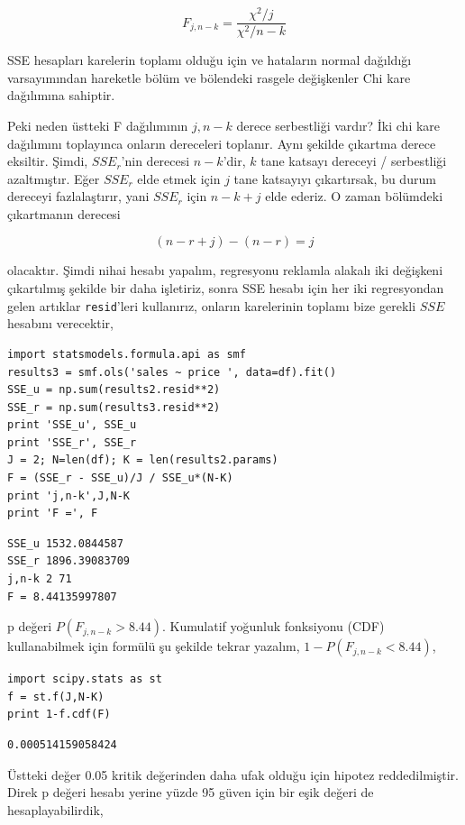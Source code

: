 \documentclass[12pt,fleqn]{article}\usepackage{../../common}
\begin{document}
$$ F_{j,n-k} = \frac{\chi^2 / j}{\chi^2 / n-k} $$

SSE hesapları karelerin toplamı olduğu için ve hataların normal dağıldığı
varsayımından hareketle bölüm ve bölendeki rasgele değişkenler Chi kare
dağılımına sahiptir.

Peki neden üstteki F dağılımının $j,n-k$ derece serbestliği vardır? İki chi
kare dağılımını toplayınca onların dereceleri toplanır. Aynı şekilde
çıkartma derece eksiltir. Şimdi, $SSE_r$'nin derecesi $n-k$'dir, $k$ tane
katsayı dereceyi / serbestliği azaltmıştır. Eğer $SSE_r$ elde etmek için
$j$ tane katsayıyı çıkartırsak, bu durum dereceyi fazlalaştırır, yani
$SSE_r$ için $n-k+j$ elde ederiz. O zaman bölümdeki çıkartmanın derecesi

$$ (n-r+j) - (n-r) = j$$

olacaktır. Şimdi nihai hesabı yapalım, regresyonu reklamla alakalı iki
değişkeni çıkartılmış şekilde bir daha işletiriz, sonra SSE hesabı için her
iki regresyondan gelen artıklar \verb!resid!'leri kullanırız, onların
karelerinin toplamı bize gerekli $SSE$ hesabını verecektir,

\begin{verbatim}
import statsmodels.formula.api as smf
results3 = smf.ols('sales ~ price ', data=df).fit()
SSE_u = np.sum(results2.resid**2)
SSE_r = np.sum(results3.resid**2)
print 'SSE_u', SSE_u
print 'SSE_r', SSE_r
J = 2; N=len(df); K = len(results2.params)
F = (SSE_r - SSE_u)/J / SSE_u*(N-K)
print 'j,n-k',J,N-K
print 'F =', F
\end{verbatim}

\begin{verbatim}
SSE_u 1532.0844587
SSE_r 1896.39083709
j,n-k 2 71
F = 8.44135997807
\end{verbatim}

p değeri $P(F_{j,n-k}>8.44)$. Kumulatif yoğunluk fonksiyonu (CDF)
kullanabilmek için formülü şu şekilde tekrar yazalım,
$1-P(F_{j,n-k}<8.44)$,

\begin{verbatim}
import scipy.stats as st
f = st.f(J,N-K)
print 1-f.cdf(F)
\end{verbatim}

\begin{verbatim}
0.000514159058424
\end{verbatim}

Üstteki değer 0.05 kritik değerinden daha ufak olduğu için hipotez
reddedilmiştir. Direk p değeri hesabı yerine yüzde 95 güven için bir eşik
değeri de hesaplayabilirdik,
\end{document}
